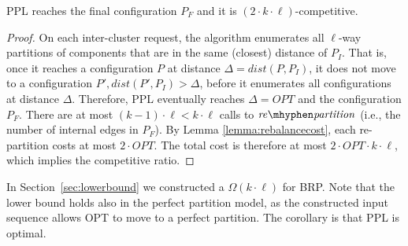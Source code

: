 \documentclass[manuscript,screen=true]{acmart}
\newcommand{\OPT}{\mathit{OPT}}
\newcommand{\OBRP}{BRP}
\newcommand\mahmoud[1]{\color{green}\textbf{\\ Mahmoud: #1}\\\color{black}}
\begin{document}
\begin{theorem}	\label{thm:upperbound}
    PPL reaches the final configuration $P_F$ and it is $(2\cdot k\cdot\ell)$-competitive.
\end{theorem}
\begin{proof}
      On each inter-cluster request,
     the algorithm enumerates all $\ell$-way partitions of components
     that are in the same (closest) distance of $P_I$.
     That is, 
     once it reaches a configuration $P$ at distance $\Delta = \mathit{dist} (P, P_I)$,
     it does not move to a configuration
     $P', \mathit{dist} (P', P_I) > \Delta$,
     before it enumerates all configurations at distance $\Delta$.
     Therefore,
     PPL eventually reaches $\Delta=\OPT$ and the configuration $P_F$.
    There are at most $(k-1)\cdot\ell < k\cdot\ell $ calls   to $\mathit{re\mhyphen partition}$
     (i.e., the number of internal edges in $P_F$).
    By Lemma \ref{lemma:rebalancecost},
    each re-partition costs at most $2\cdot\OPT$.
    The total cost is therefore at most $2\cdot\OPT\cdot k\cdot\ell$, which implies the competitive ratio.
 \end{proof}

 In Section~\ref{sec:lowerbound} we constructed a $\Omega(k \cdot \ell)$ for \OBRP{}.
 Note that the lower bound holds also in the perfect partition model, as the constructed input sequence allows OPT to move to a perfect partition.
 The corollary is that PPL is optimal.
 





  
\end{document}
